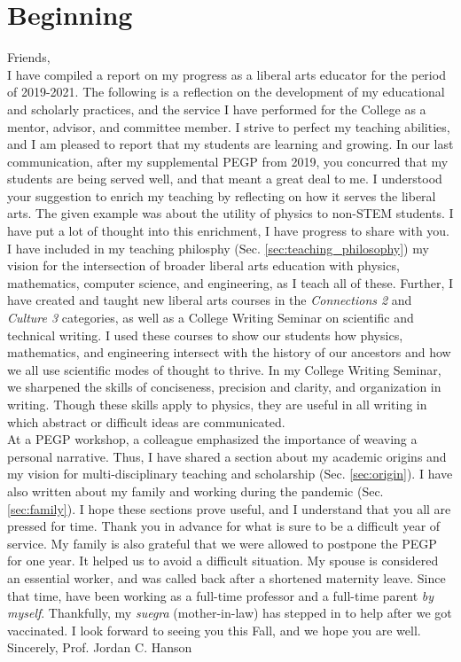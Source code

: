 \documentclass[../../main.tex]{subfiles}
\begin{document}
\section{Beginning}

Friends,
\\
\vspace{0.15cm}
I have compiled a report on my progress as a liberal arts educator for the period of 2019-2021.  The following is a reflection on the development of my educational and scholarly practices, and the service I have performed for the College as a mentor, advisor, and committee member.  I strive to perfect my teaching abilities, and I am pleased to report that my students are learning and growing.  In our last communication, after my supplemental PEGP from 2019, you concurred that my students are being served well, and that meant a great deal to me.  I understood your suggestion to enrich my teaching by reflecting on how it serves the liberal arts.  The given example was about the utility of physics to non-STEM students.  I have put a lot of thought into this enrichment, I have progress to share with you.
\\
\vspace{0.15cm}
I have included in my teaching philosphy (Sec. \ref{sec:teaching_philosophy}) my vision for the intersection of broader liberal arts education with physics, mathematics, computer science, and engineering, as I teach all of these.  Further, I have created and taught new liberal arts courses in the \textit{Connections 2} and \textit{Culture 3} categories, as well as a College Writing Seminar on scientific and technical writing.  I used these courses to show our students how physics, mathematics, and engineering intersect with the history of our ancestors and how we all use scientific modes of thought to thrive.  In my College Writing Seminar, we sharpened the skills of conciseness, precision and clarity, and organization in writing.  Though these skills apply to physics, they are useful in all writing in which abstract or difficult ideas are communicated.
\\
\vspace{0.15cm}
At a PEGP workshop, a colleague emphasized the importance of weaving a personal narrative.  Thus, I have shared a section about my academic origins and my vision for multi-disciplinary teaching and scholarship (Sec. \ref{sec:origin}).  I have also written about my family and working during the pandemic (Sec. \ref{sec:family}).  I hope these sections prove useful, and I understand that you all are pressed for time.  Thank you in advance for what is sure to be a difficult year of service.  My family is also grateful that we were allowed to postpone the PEGP for one year.  It helped us to avoid a difficult situation.  My spouse is considered an essential worker, and was called back after a shortened maternity leave.  Since that time, have been working as a full-time professor and a full-time parent \textit{by myself}.  Thankfully, my \textit{suegra} (mother-in-law) has stepped in to help after we got vaccinated.  I look forward to seeing you this Fall, and we hope you are well.
\\
\vspace{0.15cm}
Sincerely,
Prof. Jordan C. Hanson
\end{document}
